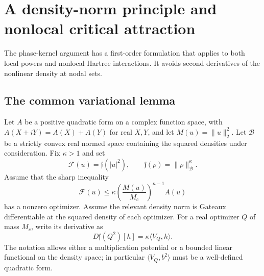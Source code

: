 \section{A density-norm principle and nonlocal critical attraction}
\label{sec:r10-hartree}

The phase-kernel argument has a first-order formulation that applies
to both local powers and nonlocal Hartree interactions. It avoids
second derivatives of the nonlinear density at nodal sets.

\subsection{The common variational lemma}

Let $A$ be a positive quadratic form on a complex function space,
with $A(X+iY)=A(X)+A(Y)$ for real $X,Y$, and let
$M(u)=\|u\|_2^2$. Let $\mathcal B$ be a strictly convex real normed
space containing the squared densities under consideration. Fix
$\kappa>1$ and set
\[
 \mathcal F(u)=\mathfrak f(|u|^2),\qquad
 \mathfrak f(\rho)=\|\rho\|_{\mathcal B}^{\kappa}.
\]
Assume that the sharp inequality
\begin{equation}\label{r10:density-gn}
 \mathcal F(u)\le\kappa
       \left(\frac{M(u)}{M_c}\right)^{\kappa-1}A(u)
\end{equation}
has a nonzero optimizer. Assume the relevant density norm is
Gateaux differentiable at the squared density of each optimizer.
For a real optimizer $Q$ of mass $M_c$, write its derivative as
\[
 D\mathfrak f(Q^2)[h]=\kappa\langle V_Q,h\rangle.
\]
The notation allows either a multiplication potential or a bounded
linear functional on the density space; in particular
$\langle V_Q,b^2\rangle$ must be a well-defined quadratic form.

